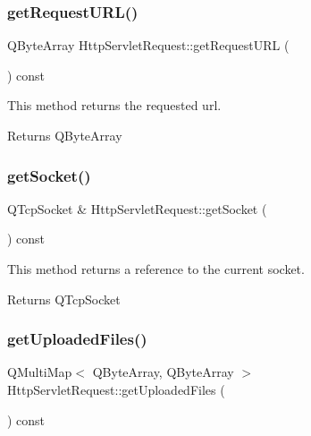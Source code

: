 \subsubsection{\texorpdfstring{get\+Request\+U\+R\+L()}{getRequestURL()}}
{\footnotesize\ttfamily Q\+Byte\+Array Http\+Servlet\+Request\+::get\+Request\+U\+RL (\begin{DoxyParamCaption}{ }\end{DoxyParamCaption}) const}



This method returns the requested url. 

\begin{DoxyReturn}{Returns}
Q\+Byte\+Array 
\end{DoxyReturn}
\mbox{\label{class_http_servlet_request_ab2d9f9c1b6189a536a5c76dbb2c9dd70}} 
\subsubsection{\texorpdfstring{get\+Socket()}{getSocket()}}
{\footnotesize\ttfamily Q\+Tcp\+Socket \& Http\+Servlet\+Request\+::get\+Socket (\begin{DoxyParamCaption}{ }\end{DoxyParamCaption}) const}



This method returns a reference to the current socket. 

\begin{DoxyReturn}{Returns}
Q\+Tcp\+Socket 
\end{DoxyReturn}
\mbox{\label{class_http_servlet_request_a8ea2cfef7079b3071f64a369f679b972}} 
\subsubsection{\texorpdfstring{get\+Uploaded\+Files()}{getUploadedFiles()}}
{\footnotesize\ttfamily Q\+Multi\+Map$<$ Q\+Byte\+Array, Q\+Byte\+Array $>$ Http\+Servlet\+Request\+::get\+Uploaded\+Files (\begin{DoxyParamCaption}{ }\end{DoxyParamCaption}) const}



